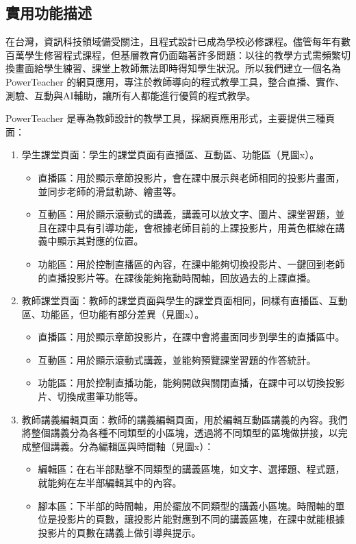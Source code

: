 \documentclass[12pt]{article}
\begin{document}
\subsection{實用功能描述}
在台灣，資訊科技領域備受關注，且程式設計已成為學校必修課程。儘管每年有數百萬學生修習程式課程，但基層教育仍面臨著許多問題：以往的教學方式需頻繁切換畫面給學生練習、課堂上教師無法即時得知學生狀況。所以我們建立一個名為 PowerTeacher 的網頁應用，專注於教師導向的程式教學工具，整合直播、實作、測驗、互動與AI輔助，讓所有人都能進行優質的程式教學。\\
\par PowerTeacher 是專為教師設計的教學工具，採網頁應用形式，主要提供三種頁面：\\
\begin{enumerate}[label=(\arabic*)]
  \item 學生課堂頁面：學生的課堂頁面有直播區、互動區、功能區（見圖x）。
  \begin{itemize}
    \item 直播區：用於顯示章節投影片，會在課中展示與老師相同的投影片畫面，並同步老師的滑鼠軌跡、繪畫等。
    \item 互動區：用於顯示滾動式的講義，講義可以放文字、圖片、課堂習題，並且在課中具有引導功能，會根據老師目前的上課投影片，用黃色框線在講義中顯示其對應的位置。
    \item 功能區：用於控制直播區的內容，在課中能夠切換投影片、一鍵回到老師的直播投影片等。在課後能夠拖動時間軸，回放過去的上課直播。
  \end{itemize}

  \item 教師課堂頁面：教師的課堂頁面與學生的課堂頁面相同，同樣有直播區、互動區、功能區，但功能有部分差異（見圖x）。
  \begin{itemize}
    \item 直播區：用於顯示章節投影片，在課中會將畫面同步到學生的直播區中。
    \item 互動區：用於顯示滾動式講義，並能夠預覽課堂習題的作答統計。
    \item 功能區：用於控制直播功能，能夠開啟與關閉直播，在課中可以切換投影片、切換成畫筆功能等。
  \end{itemize}

  \item 教師講義編輯頁面：教師的講義編輯頁面，用於編輯互動區講義的內容。我們將整個講義分為各種不同類型的小區塊，透過將不同類型的區塊做拼接，以完成整個講義。分為編輯區與時間軸（見圖x）：
  \begin{itemize}
    \item 編輯區：在右半部點擊不同類型的講義區塊，如文字、選擇題、程式題，就能夠在左半部編輯其中的內容。
    \item 腳本區：下半部的時間軸，用於擺放不同類型的講義小區塊。時間軸的單位是投影片的頁數，讓投影片能對應到不同的講義區塊，在課中就能根據投影片的頁數在講義上做引導與提示。
  \end{itemize}
\end{enumerate}
\end{document}

